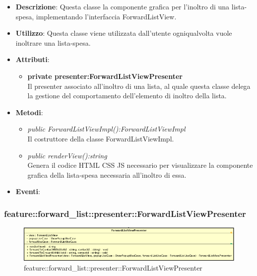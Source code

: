 \begin{itemize}
\item \textbf{Descrizione}: Questa classe la componente grafica per l'inoltro di una lista-spesa, implementando l'interfaccia ForwardListView.
\item \textbf{Utilizzo}: Questa classe viene utilizzata dall'utente ogniqualvolta vuole inoltrare una lista-spesa.
\item \textbf{Attributi}:
\begin{itemize}
\item \textbf{private presenter:ForwardListViewPresenter}\\
Il presenter associato all'inoltro di una lista, al quale questa classe delega la gestione del comportamento dell'elemento di inoltro della lista.
\end{itemize}
\item \textbf{Metodi}: 
	\begin{itemize}
	\item \textit{public ForwardListViewImpl():ForwardListViewImpl}\\
	Il costruttore della classe ForwardListViewImpl.
	\item \textit{public renderView():string}\\
		Genera il codice HTML CSS JS necessario per visualizzare la componente grafica della lista-spesa necessaria all'inoltro di essa.
	\end{itemize}
\item \textbf{Eventi}:
\end{itemize}

\subsubsection{feature::forward\_list::presenter::ForwardListViewPresenter}

\label{feature::forward\_list::presenter::ForwardListViewPresenter}
\begin{figure}[ht]
	\centering
	\includegraphics[scale=0.5]{Sezioni/SottosezioniST/img/app/ForwardListViewPresenter.png}
	\caption{feature::forward\_list::presenter::ForwardListViewPresenter}
\end{figure}

